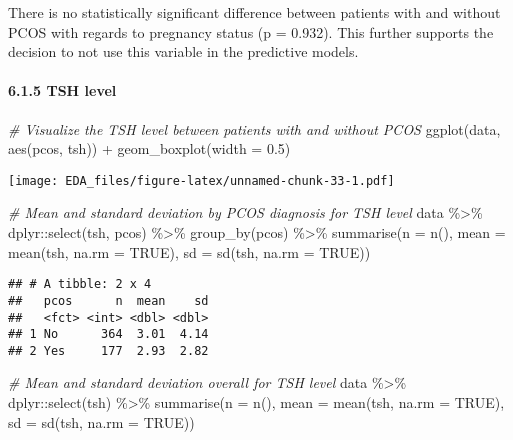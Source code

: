 \documentclass[
]{article}
\newenvironment{Shaded}{\begin{snugshade}}{\end{snugshade}}
\newcommand{\AttributeTok}[1]{\textcolor[rgb]{0.77,0.63,0.00}{#1}}
\newcommand{\CommentTok}[1]{\textcolor[rgb]{0.56,0.35,0.01}{\textit{#1}}}
\newcommand{\ConstantTok}[1]{\textcolor[rgb]{0.00,0.00,0.00}{#1}}
\newcommand{\FloatTok}[1]{\textcolor[rgb]{0.00,0.00,0.81}{#1}}
\newcommand{\FunctionTok}[1]{\textcolor[rgb]{0.00,0.00,0.00}{#1}}
\newcommand{\NormalTok}[1]{#1}
\newcommand{\SpecialCharTok}[1]{\textcolor[rgb]{0.00,0.00,0.00}{#1}}
\begin{document}
There is no statistically significant difference between patients with
and without PCOS with regards to pregnancy status (p = 0.932). This
further supports the decision to not use this variable in the predictive
models.

\hypertarget{tsh-level}{%
\paragraph{6.1.5 TSH level}\label{tsh-level}}

\begin{Shaded}
\begin{Highlighting}[]
\CommentTok{\# Visualize the TSH level between patients with and without PCOS}
\FunctionTok{ggplot}\NormalTok{(data, }\FunctionTok{aes}\NormalTok{(pcos, tsh)) }\SpecialCharTok{+} \FunctionTok{geom\_boxplot}\NormalTok{(}\AttributeTok{width =} \FloatTok{0.5}\NormalTok{)}
\end{Highlighting}
\end{Shaded}

\texttt{[image: EDA\_files/figure-latex/unnamed-chunk-33-1.pdf]}

\begin{Shaded}
\begin{Highlighting}[]
\CommentTok{\# Mean and standard deviation by PCOS diagnosis for TSH level}
\NormalTok{data }\SpecialCharTok{\%\textgreater{}\%}\NormalTok{ dplyr}\SpecialCharTok{::}\FunctionTok{select}\NormalTok{(tsh, pcos) }\SpecialCharTok{\%\textgreater{}\%} \FunctionTok{group\_by}\NormalTok{(pcos) }\SpecialCharTok{\%\textgreater{}\%} 
  \FunctionTok{summarise}\NormalTok{(}\AttributeTok{n =} \FunctionTok{n}\NormalTok{(), }
            \AttributeTok{mean =} \FunctionTok{mean}\NormalTok{(tsh, }\AttributeTok{na.rm =} \ConstantTok{TRUE}\NormalTok{), }
            \AttributeTok{sd =} \FunctionTok{sd}\NormalTok{(tsh, }\AttributeTok{na.rm =} \ConstantTok{TRUE}\NormalTok{))}
\end{Highlighting}
\end{Shaded}

\begin{verbatim}
## # A tibble: 2 x 4
##   pcos      n  mean    sd
##   <fct> <int> <dbl> <dbl>
## 1 No      364  3.01  4.14
## 2 Yes     177  2.93  2.82
\end{verbatim}

\begin{Shaded}
\begin{Highlighting}[]
\CommentTok{\# Mean and standard deviation overall for TSH level}
\NormalTok{data }\SpecialCharTok{\%\textgreater{}\%}\NormalTok{ dplyr}\SpecialCharTok{::}\FunctionTok{select}\NormalTok{(tsh) }\SpecialCharTok{\%\textgreater{}\%} 
  \FunctionTok{summarise}\NormalTok{(}\AttributeTok{n =} \FunctionTok{n}\NormalTok{(), }
            \AttributeTok{mean =} \FunctionTok{mean}\NormalTok{(tsh, }\AttributeTok{na.rm =} \ConstantTok{TRUE}\NormalTok{), }
            \AttributeTok{sd =} \FunctionTok{sd}\NormalTok{(tsh, }\AttributeTok{na.rm =} \ConstantTok{TRUE}\NormalTok{))}
\end{Highlighting}
\end{Shaded}
\end{document}
